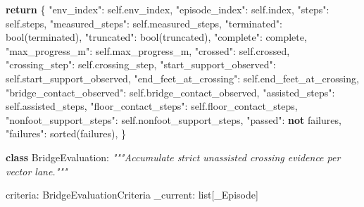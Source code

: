 \documentclass[
  chinese,
  11pt,
  letterpaper,
]{article}
\newenvironment{Shaded}{\begin{snugshade}}{\end{snugshade}}
\newcommand{\BuiltInTok}[1]{#1}
\newcommand{\CommentTok}[1]{\textcolor[rgb]{0.56,0.35,0.01}{\textit{#1}}}
\newcommand{\ControlFlowTok}[1]{\textcolor[rgb]{0.13,0.29,0.53}{\textbf{#1}}}
\newcommand{\KeywordTok}[1]{\textcolor[rgb]{0.13,0.29,0.53}{\textbf{#1}}}
\newcommand{\NormalTok}[1]{#1}
\newcommand{\StringTok}[1]{\textcolor[rgb]{0.31,0.60,0.02}{#1}}
\newcommand{\VariableTok}[1]{\textcolor[rgb]{0.00,0.00,0.00}{#1}}
\renewenvironment{Shaded}{\par\smallskip}{\par\smallskip}
\begin{document}
\begin{Shaded}
\begin{Highlighting}[]
        \ControlFlowTok{return}\NormalTok{ \{}
            \StringTok{"env\_index"}\NormalTok{: }\VariableTok{self}\NormalTok{.env\_index,}
            \StringTok{"episode\_index"}\NormalTok{: }\VariableTok{self}\NormalTok{.index,}
            \StringTok{"steps"}\NormalTok{: }\VariableTok{self}\NormalTok{.steps,}
            \StringTok{"measured\_steps"}\NormalTok{: }\VariableTok{self}\NormalTok{.measured\_steps,}
            \StringTok{"terminated"}\NormalTok{: }\BuiltInTok{bool}\NormalTok{(terminated),}
            \StringTok{"truncated"}\NormalTok{: }\BuiltInTok{bool}\NormalTok{(truncated),}
            \StringTok{"complete"}\NormalTok{: complete,}
            \StringTok{"max\_progress\_m"}\NormalTok{: }\VariableTok{self}\NormalTok{.max\_progress\_m,}
            \StringTok{"crossed"}\NormalTok{: }\VariableTok{self}\NormalTok{.crossed,}
            \StringTok{"crossing\_step"}\NormalTok{: }\VariableTok{self}\NormalTok{.crossing\_step,}
            \StringTok{"start\_support\_observed"}\NormalTok{: }\VariableTok{self}\NormalTok{.start\_support\_observed,}
            \StringTok{"end\_feet\_at\_crossing"}\NormalTok{: }\VariableTok{self}\NormalTok{.end\_feet\_at\_crossing,}
            \StringTok{"bridge\_contact\_observed"}\NormalTok{: }\VariableTok{self}\NormalTok{.bridge\_contact\_observed,}
            \StringTok{"assisted\_steps"}\NormalTok{: }\VariableTok{self}\NormalTok{.assisted\_steps,}
            \StringTok{"floor\_contact\_steps"}\NormalTok{: }\VariableTok{self}\NormalTok{.floor\_contact\_steps,}
            \StringTok{"nonfoot\_support\_steps"}\NormalTok{: }\VariableTok{self}\NormalTok{.nonfoot\_support\_steps,}
            \StringTok{"passed"}\NormalTok{: }\KeywordTok{not}\NormalTok{ failures,}
            \StringTok{"failures"}\NormalTok{: }\BuiltInTok{sorted}\NormalTok{(failures),}
\NormalTok{        \}}


\KeywordTok{class}\NormalTok{ BridgeEvaluation:}
    \CommentTok{"""Accumulate strict unassisted crossing evidence per vector lane."""}

\NormalTok{    criteria: BridgeEvaluationCriteria}
\NormalTok{    \_current: }\BuiltInTok{list}\NormalTok{[\_Episode]}


\end{Highlighting}
\end{Shaded}
\end{document}
